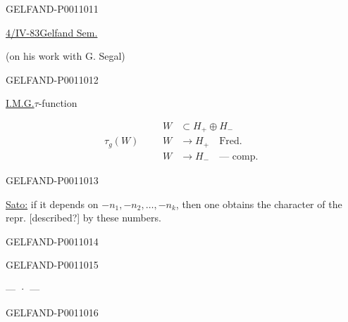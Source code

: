 \begin{GelfandAdjacentEvidence}{GELFAND-P001101}{1}
\begin{center}
\underline{4/IV-83}\qquad\underline{Gelfand Sem.}\\[.3em]
\end{center}

(on his work with G. Segal)
\end{GelfandAdjacentEvidence}
\begin{GelfandAdjacentEvidence}{GELFAND-P001101}{2}


\underline{I.M.G.}\quad $\tau$-function

\[
\tau_g(W)\qquad
\begin{aligned}
W&\subset H_+\oplus H_-\\
W&\to H_+\quad\text{Fred.}\\
W&\to H_-\quad\text{— comp.}
\end{aligned}
\]
\end{GelfandAdjacentEvidence}
\begin{GelfandAdjacentEvidence}{GELFAND-P001101}{3}


\underline{Sato:} if it depends on $-n_1,-n_2,\ldots,-n_k$,
then one obtains the character of the repr. [described?] by these numbers.
\end{GelfandAdjacentEvidence}
\begin{GelfandAdjacentEvidence}{GELFAND-P001101}{4}

\end{GelfandAdjacentEvidence}
\begin{GelfandAdjacentEvidence}{GELFAND-P001101}{5}


\begin{center}— · —\end{center}
\end{GelfandAdjacentEvidence}
\begin{GelfandAdjacentEvidence}{GELFAND-P001101}{6}


\end{GelfandAdjacentEvidence}
